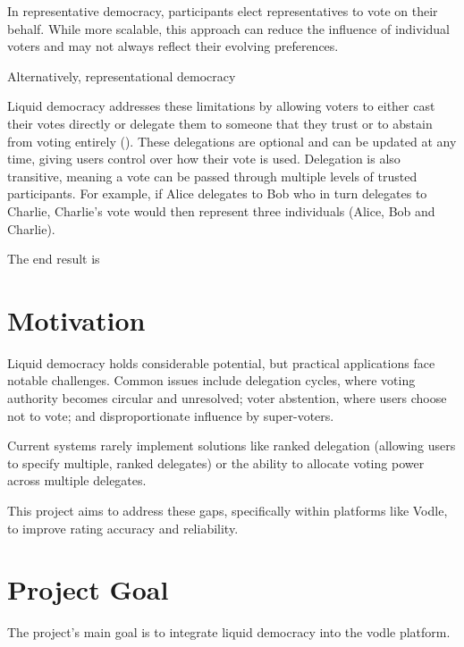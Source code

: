 In representative democracy, participants elect representatives to vote on their behalf. While more scalable, this approach can reduce the influence of individual voters and may not always reflect their evolving preferences.


Alternatively, representational democracy

Liquid democracy addresses these limitations by allowing voters to either cast their votes directly or delegate them to someone that they trust or to abstain from voting entirely (\cite{blum_liquid_2016}). These delegations are optional and can be updated at any time, giving users control over how their vote is used. Delegation is also transitive, meaning a vote can be passed through multiple levels of trusted participants. For example, if Alice delegates to Bob who in turn delegates to Charlie, Charlie's vote would then represent three individuals (Alice, Bob and Charlie).



The end result is 

\section{Motivation}
Liquid democracy holds considerable potential, but practical applications face notable challenges. Common issues include delegation cycles, where voting authority becomes circular and unresolved; voter abstention, where users choose not to vote; and disproportionate influence by super-voters.

Current systems rarely implement solutions like ranked delegation (allowing users to specify multiple, ranked delegates) or the ability to allocate voting power across multiple delegates.

This project aims to address these gaps, specifically within platforms like Vodle, to improve rating accuracy and reliability.

\section{Project Goal}
The project's main goal is to integrate liquid democracy into the vodle platform.

